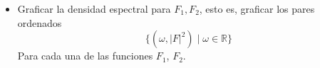 \documentclass[12pt,a4paper]{report}
\begin{document}
\begin{enumerate}[label=\alph*),left=0pt]
\begin {itemize}[left=0pt]
\begin{figure}[h!]
\begin{minipage}{0.45\textwidth}
            \caption{Espectro de frecuencia en módulo para $x_2$}
            \label{fig:imagen2}
          \end{minipage}
        \end{figure}

        \textbf{Reflexionar:} ¿El espectro de frecuencia en módulo es discreto o continuo? ¿El gráfico admite una 
        simetría par, impar o ninguna?\\

        Para ambas señales el espectro de frecuencia en modulo es una señal de tiempo continuo, y admiten simetría par.\\

      \item Graficar la densidad espectral para $F_1, F_2$, esto es, graficar los pares ordenados
        $$\{(\omega, |F|^2) \mid \omega \in \mathbb{R}\}$$
        Para cada una de las funciones $F_1$, $F_2$.\\


\end{itemize}
\end{enumerate}
\end{document}
